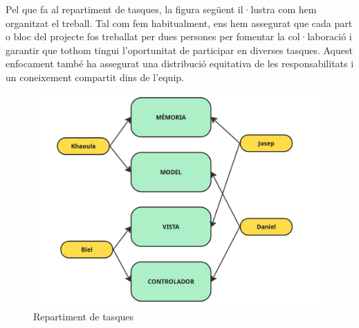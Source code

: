 \documentclass{ieeetj}
\begin{document}
Pel que fa al repartiment de tasques, la figura següent il·lustra com hem organitzat el treball. Tal com fem habitualment, ens hem assegurat que cada part o bloc del projecte fos treballat per dues persones per fomentar la col·laboració i garantir que tothom tingui l'oportunitat de participar en diverses tasques. Aquest enfocament també ha assegurat una distribució equitativa de les responsabilitats i un coneixement compartit dins de l'equip.


\begin{figure}[H]
    \centering
    \includegraphics[width=0.75\linewidth]{png/repartimentFeina.jpg}
    \caption{Repartiment de tasques}
    \label{fig:enter-label}
\end{figure}
\end{document}
